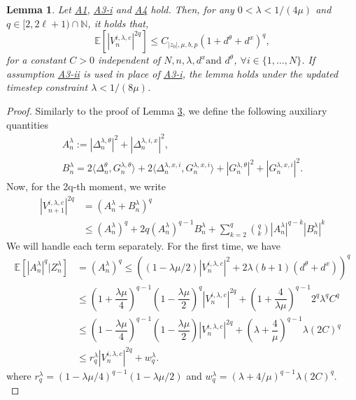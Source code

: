 \documentclass[a4paper, 10pt]{article}
\theoremstyle{plain}%
\newtheorem{lemma}{Lemma}%
\begin{document}
\noindent \begin{lemma} \label{lemma6}Let \hyperlink{Assum1}{A1}, \hyperlink{Assum3a}{A3-i} and \hyperlink{Assum4}{A4} hold. Then, for any $0<\lambda<1/(4\mu)$ and $q\in[2,2\ell+1)\cap\mathbb{N}$, it holds that, 
$$\mathbb{E}\left[|V_{n}^{i,\lambda,c}|^{2q}\right]\leq C_{|z_0|,\mu,b,p}(1+d^{\theta}+d^x)^q,$$
for a constant $C>0$ independent of $N,n,\lambda, d^x \text{and } d^{\theta}$, $\forall i\in\{1,\ldots,N\}$. If assumption \hyperlink{Assum3b}{A3-ii} is used in place of \hyperlink{Assum3a}{A3-i}, the lemma holds under the updated timestep constraint $\lambda<1/(8\mu)$.\end{lemma}
\begin{proof}
Similarly to the proof of Lemma \hyperlink{lemma2}{3}, we define the following auxiliary quantities
\begin{gather*}
A_n^{\lambda}:=|\Delta_n^{\lambda,\theta}|^2+|\Delta_n^{\lambda,i,x}|^2,\\
B^{\lambda}_n=2\langle \Delta_n^{\theta},G_n^{\lambda,\theta}\rangle+2\langle \Delta_n^{\lambda,x,i},G_n^{\lambda,x,i}\rangle+|G_n^{\lambda,\theta}|^2+|G_n^{\lambda,x,i}|^2.
\end{gather*}
Now, for the 2q-th moment, we write
\begin{align}
|V^{i,\lambda,c}_{n+1}|^{2q}&=\left(A_n^{\lambda}+B^{\lambda}_n\right)^q\nonumber\\
&\leq (A_n^{\lambda})^q+2q(A_n^{\lambda})^{q-1}B^{\lambda}_n+\sum_{k=2}^q\binom{q}{k}|A_n^{\lambda}|^{q-k}|B^{\lambda}_n|^k\label{d1}
\end{align}
We will handle each term separately. For the first time, we have
\begin{align}
\mathbb{E}\left[|A_n^{\lambda}|^q|Z_n^{\lambda}\right]&=(A_n^{\lambda})^{q}\leq \left((1-\lambda\mu/2)\left|V_{n}^{i,\lambda,c}\right|^2+2\lambda(b+1)(d^{\theta}+d^x)\right)^q\nonumber\\
&\leq \left(1+\dfrac{\lambda \mu}{4}\right)^{q-1}\left(1-\dfrac{\lambda\mu}{2}\right)^q|V^{i,\lambda,c}_{n}|^{2q}+\left(1+\dfrac{4}{\lambda\mu }\right)^{q-1}2^q{\lambda}^q C^q\nonumber\\
&\leq \left(1-\dfrac{\lambda\mu}{4}\right)^{q-1}\left(1-\dfrac{\lambda\mu}{2}\right)|V^{i,\lambda,c}_{n}|^{2q}+\left(\lambda+\dfrac{4}{\mu }\right)^{q-1}\lambda (2C)^q\nonumber\\
&\leq r_q^{\lambda}|V^{i,\lambda,c}_{n}|^{2q}+w_q^{\lambda}.\label{d2}
\end{align}
where $r_q^{\lambda}=(1-\lambda\mu/4)^{q-1}(1-\lambda\mu/2)$ and $w_q^{\lambda}=(\lambda+4/\mu)^{q-1}\lambda (2C)^q$.\\

\end{proof}
\end{document}
